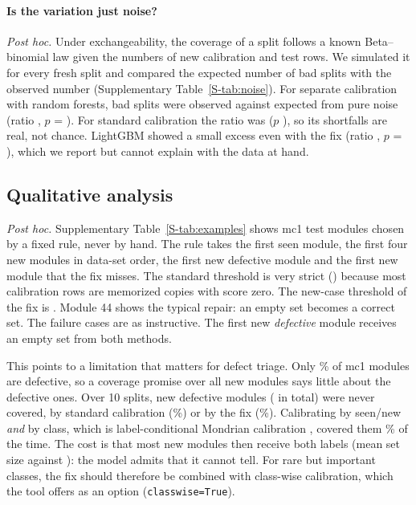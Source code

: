 \paragraph{Is the variation just noise?} \emph{Post hoc.} Under exchangeability, the coverage of a split follows a known Beta--binomial law given the numbers of new calibration and test rows. We simulated it for every fresh split and compared the expected number of bad splits with the observed number (Supplementary Table~\ref{S-tab:noise}). For separate calibration with random forests, \NNoiseMCPRfObs{} bad splits were observed against \NNoiseMCPRfExp{} expected from pure noise (ratio \NNoiseMCPRfRatio{}, $p$ = \NNoiseMCPRfP{}). For standard calibration the ratio was \NNoiseSCPRfRatio{} ($p$ \NNoiseSCPRfP{}), so its shortfalls are real, not chance. LightGBM showed a small excess even with the fix (ratio \NNoiseMCPLgbmRatio{}, $p$ = \NNoiseMCPLgbmP{}), which we report but cannot explain with the data at hand.

\subsection{Qualitative analysis}\label{sec:res-qual}
\emph{Post hoc.} Supplementary Table~\ref{S-tab:examples} shows mc1 test modules chosen by a fixed rule, never by hand. The rule takes the first seen module, the first four new modules in data-set order, the first new defective module and the first new module that the fix misses. The standard threshold is very strict (\NExQStd{}) because most calibration rows are memorized copies with score zero. The new-case threshold of the fix is \NExQNew{}. Module 44 shows the typical repair: an empty set becomes a correct set. The failure cases are as instructive. The first new \emph{defective} module receives an empty set from both methods.


This points to a limitation that matters for defect triage. Only \NMcOneDefShare{}\% of mc1 modules are defective, so a coverage promise over all new modules says little about the defective ones. Over 10 splits, new defective modules (\NCcFixDefN{} in total) were never covered, by standard calibration (\NCcStdDefCov{}\%) or by the fix (\NCcFixDefCov{}\%). Calibrating by seen/new \emph{and} by class, which is label-conditional Mondrian calibration \citep{vovk2022}, covered them \NCcClsDefCov{}\% of the time. The cost is that most new modules then receive both labels (mean set size \NCcClsOkSize{} against \NCcFixOkSize{}): the model admits that it cannot tell. For rare but important classes, the fix should therefore be combined with class-wise calibration, which the tool offers as an option (\texttt{classwise=True}).

